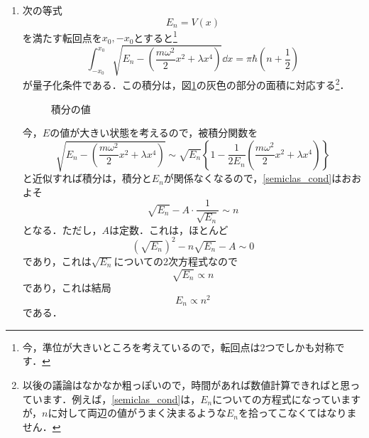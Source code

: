 \documentclass[a4paper,pdflatex,ja=standard]{bxjsarticle}
\begin{document}
\begin{enumerate}
  \item 
  次の等式
  \begin{equation}
    E_{n}
    =
    V(x)
  \end{equation}
  を満たす転回点を$x_{0},-x_{0}$とすると\footnote{今，準位が大きいところを考えているので，転回点は2つでしかも対称です．\label{comment}}
  \begin{equation}
    \int_{-x_{0}}^{x_{0}}\sqrt{E_{n}-\left(  
      \frac{m\omega^2}{2}x^2+\lambda x^4
    \right)}
    \dd x
    =\pi\hbar\left( n+\frac{1}{2} \right)
    \label{semiclas_cond}
  \end{equation}
  が量子化条件である．この積分は，図\ref{int_fig}の灰色の部分の面積に対応する\footnote{以後の議論はなかなか粗っぽいので，時間があれば数値計算できればと思っています．例えば，\eqref{semiclas_cond}は，$E_{n}$についての方程式になっていますが，$n$に対して両辺の値がうまく決まるような$E_{n}$を拾ってこなくてはなりません．}．

  \begin{figure}[ht]
    \centering    
    \caption{積分の値}
    \label{int_fig}
  \end{figure}

  今，$E$の値が大きい状態を考えるので，被積分関数を
  \begin{equation}
    \sqrt{E_{n}-\left(  
      \frac{m\omega^2}{2}x^2+\lambda x^4
    \right)}
    \sim
    \sqrt{E_{n}}
    \left\{  
      1-\frac{1}{2E_{n}}
      \left( 
        \frac{m\omega^2}{2}x^2+\lambda x^4 
      \right)
    \right\}
  \end{equation}
  と近似すれば積分は，積分と$E_{n}$が関係なくなるので，\eqref{semiclas_cond}はおおよそ
  \begin{equation}
    \sqrt{E_{n}}
    -
    A\cdot\frac{1}{\sqrt{E_{n}}}
    \sim
    n
  \end{equation}
  となる．ただし，$A$は定数．これは，ほとんど
  \begin{equation}
    (\sqrt{E_{n}})^2
    -
    n\sqrt{E_{n}}
    -
    A
    \sim 0
  \end{equation}
  であり，これは$\sqrt{E_n}$についての2次方程式なので
  \begin{equation}
    \sqrt{E_{n}}
    \propto
    n
  \end{equation}
  であり，これは結局
  \begin{equation}
    E_{n}
    \propto
    n^2
  \end{equation}
  である．

\end{enumerate}
\end{document}
